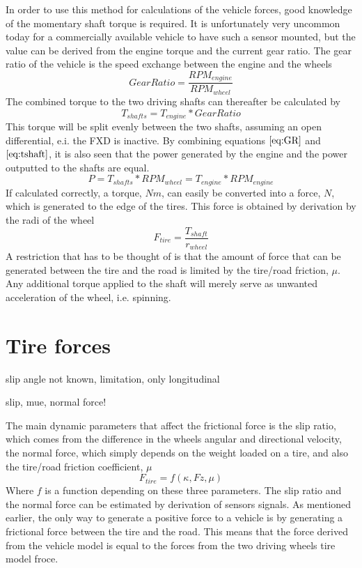 In order to use this method for calculations of the vehicle forces, good knowledge of the momentary shaft torque is required. It is unfortunately very uncommon today for a commercially available vehicle to have such a sensor mounted, but the value can be derived from the engine torque and the current gear ratio. The gear ratio of the vehicle is the speed exchange between the engine and the wheels
\begin{equation}
	\label{eq:GR}
	Gear Ratio = \frac{RPM_{engine}}{RPM_{wheel}}
\end{equation}
The combined torque to the two driving shafts can thereafter be calculated by
\begin{equation}
	\label{eq:tshaft}
	T_{shafts} = T_{engine}*Gear Ratio
\end{equation}
This torque will be split evenly between the two shafts, assuming an open differential, e.i. the FXD is inactive. By combining equations $ \ref{eq:GR} $ and $ \ref{eq:tshaft} $, it is also seen that the power generated by the engine and the power outputted to the shafts are equal.
\begin{equation}
	P = T_{shafts}*RPM_{wheel} = T_{engine}*RPM_{engine}
\end{equation}
If calculated correctly, a torque, $ Nm $, can easily be converted into a force, $ N $, which is generated to the edge of the tires. This force is obtained by derivation by the radi of the wheel
\begin{equation}
	F_{tire} = \frac{T_{shaft}}{r_{wheel}}
\end{equation}
A restriction that has to be thought of is that the amount of force that can be generated between the tire and the road is limited by the tire/road friction, $ \mu $. Any additional torque applied to the shaft will merely serve as unwanted acceleration of the wheel, i.e. spinning.


\section{Tire forces}

slip angle not known, limitation, only longitudinal

slip, mue, normal force!

The main dynamic parameters that affect the frictional force is the slip ratio, which comes from the difference in the wheels angular and  directional velocity, the normal force, which simply depends on the weight loaded on a tire, and also the tire/road friction coefficient, $ \mu $
\begin{equation}
	F_{tire} = f(\kappa, Fz, \mu)
\end{equation}
Where $ f $ is a function depending on these three parameters. The slip ratio and the normal force can be estimated by derivation of sensors signals. As mentioned earlier, the only way to generate a positive force to a vehicle is by generating a frictional force between the tire and the road. This means that the force derived from the vehicle model is equal to the forces from the two driving wheels tire model froce.
